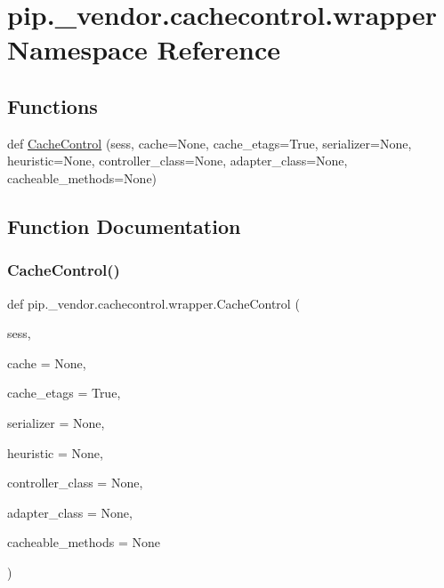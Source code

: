 \hypertarget{namespacepip_1_1__vendor_1_1cachecontrol_1_1wrapper}{}\section{pip.\+\_\+vendor.\+cachecontrol.\+wrapper Namespace Reference}
\label{namespacepip_1_1__vendor_1_1cachecontrol_1_1wrapper}
\subsection*{Functions}
\begin{DoxyCompactItemize}
\item 
def \hyperlink{namespacepip_1_1__vendor_1_1cachecontrol_1_1wrapper_a437f04c1b6f3e0fd57c213fd304d5679}{Cache\+Control} (sess, cache=None, cache\+\_\+etags=True, serializer=None, heuristic=None, controller\+\_\+class=None, adapter\+\_\+class=None, cacheable\+\_\+methods=None)
\end{DoxyCompactItemize}


\subsection{Function Documentation}
\mbox{\label{namespacepip_1_1__vendor_1_1cachecontrol_1_1wrapper_a437f04c1b6f3e0fd57c213fd304d5679}} 
\subsubsection{\texorpdfstring{Cache\+Control()}{CacheControl()}}
{\footnotesize\ttfamily def pip.\+\_\+vendor.\+cachecontrol.\+wrapper.\+Cache\+Control (\begin{DoxyParamCaption}\item[{}]{sess,  }\item[{}]{cache = {\ttfamily None},  }\item[{}]{cache\+\_\+etags = {\ttfamily True},  }\item[{}]{serializer = {\ttfamily None},  }\item[{}]{heuristic = {\ttfamily None},  }\item[{}]{controller\+\_\+class = {\ttfamily None},  }\item[{}]{adapter\+\_\+class = {\ttfamily None},  }\item[{}]{cacheable\+\_\+methods = {\ttfamily None} }\end{DoxyParamCaption})}

